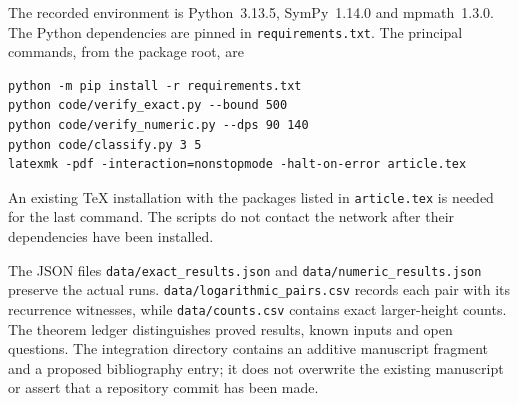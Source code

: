 The recorded environment is Python~3.13.5, SymPy~1.14.0 and
mpmath~1.3.0. The Python dependencies are pinned in
\nolinkurl{requirements.txt}. The principal commands, from the package
root, are
\begin{verbatim}
python -m pip install -r requirements.txt
python code/verify_exact.py --bound 500
python code/verify_numeric.py --dps 90 140
python code/classify.py 3 5
latexmk -pdf -interaction=nonstopmode -halt-on-error article.tex
\end{verbatim}
An existing TeX installation with the packages listed in
\nolinkurl{article.tex} is needed for the last command. The scripts do
not contact the network after their dependencies have been installed.

The JSON files \nolinkurl{data/exact_results.json} and
\nolinkurl{data/numeric_results.json} preserve the actual runs.
\nolinkurl{data/logarithmic_pairs.csv} records each pair with its
recurrence witnesses, while \nolinkurl{data/counts.csv} contains exact
larger-height counts. The theorem ledger distinguishes proved results,
known inputs and open questions. The integration directory contains an
additive manuscript fragment and a proposed bibliography entry; it does
not overwrite the existing manuscript or assert that a repository commit
has been made.
